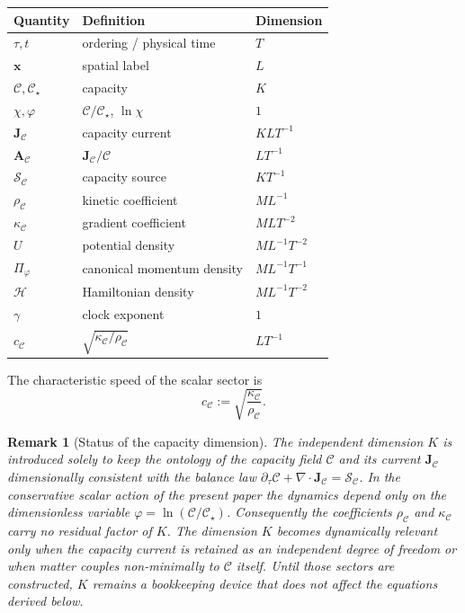 \documentclass[11pt,a4paper]{article}
\newtheorem{remark}[axiom]{Remark}
\newcommand{\C}{\mathcal{C}}
\newcommand{\Cs}{\mathcal{C}_\star}
\newcommand{\Jc}{\mathbf{J}_{\mathcal{C}}}
\newcommand{\Sc}{\mathcal{S}_{\mathcal{C}}}
\newcommand{\Ac}{\mathbf{A}_{\mathcal{C}}}
\newcommand{\Ham}{\mathcal{H}}
\newcommand{\rhoC}{\rho_{\mathcal{C}}}
\newcommand{\kC}{\kappa_{\mathcal{C}}}
\begin{document}
\begin{center}
\begin{tabular}{@{}lll@{}}
\toprule
Quantity & Definition & Dimension\\
\midrule
\(\tau,t\) & ordering / physical time & \(T\)\\
\(\mathbf{x}\) & spatial label & \(L\)\\
\(\C,\Cs\) & capacity & \(K\)\\
\(\chi,\varphi\) & \(\C/\Cs\), \(\ln\chi\) & \(1\)\\
\(\Jc\) & capacity current & \(KLT^{-1}\)\\
\(\Ac\) & \(\Jc/\C\) & \(LT^{-1}\)\\
\(\Sc\) & capacity source & \(KT^{-1}\)\\
\(\rhoC\) & kinetic coefficient & \(ML^{-1}\)\\
\(\kC\) & gradient coefficient & \(MLT^{-2}\)\\
\(U\) & potential density & \(ML^{-1}T^{-2}\)\\
\(\Pi_\varphi\) & canonical momentum density & \(ML^{-1}T^{-1}\)\\
\(\Ham\) & Hamiltonian density & \(ML^{-1}T^{-2}\)\\
\(\gamma\) & clock exponent & \(1\)\\
\(c_{\mathcal{C}}\) & \(\sqrt{\kC/\rhoC}\) & \(LT^{-1}\)\\
\bottomrule
\end{tabular}
\end{center}

The characteristic speed of the scalar sector is
\[
c_{\mathcal{C}}:=\sqrt{\frac{\kC}{\rhoC}}.
\]

\begin{remark}[Status of the capacity dimension]
The independent dimension \(K\) is introduced solely to keep the ontology of the capacity field \(\C\) and its current \(\Jc\) dimensionally consistent with the balance law \(\partial_\tau\C+\nabla\cdot\Jc=\Sc\). In the conservative scalar action of the present paper the dynamics depend only on the dimensionless variable \(\varphi=\ln(\C/\Cs)\). Consequently the coefficients \(\rhoC\) and \(\kC\) carry no residual factor of \(K\). The dimension \(K\) becomes dynamically relevant only when the capacity current is retained as an independent degree of freedom or when matter couples non-minimally to \(\C\) itself. Until those sectors are constructed, \(K\) remains a bookkeeping device that does not affect the equations derived below.
\end{remark}
\end{document}
